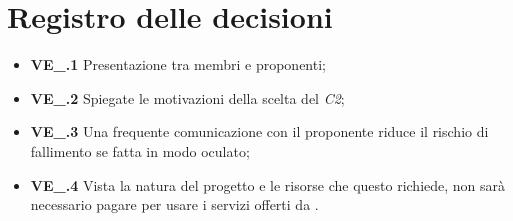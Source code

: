 \section{Registro delle decisioni}
\begin{itemize}
  \item \textbf{VE\_\Data.1} Presentazione tra membri e proponenti;
  \item \textbf{VE\_\Data.2} Spiegate le motivazioni della scelta del  \textit{C2};
  \item \textbf{VE\_\Data.3} Una frequente comunicazione con il proponente riduce il rischio di fallimento se fatta in modo oculato;
  \item \textbf{VE\_\Data.4} Vista la natura del progetto e le risorse che questo richiede, non sarà necessario pagare per usare i servizi offerti da .
\end{itemize}




